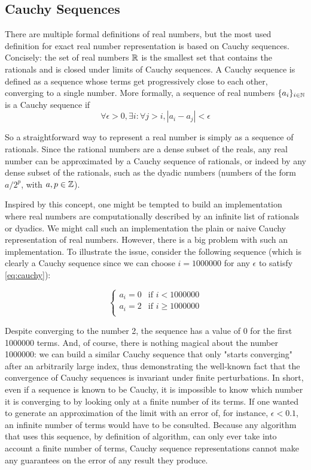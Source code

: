 \subsection{Cauchy Sequences}
\label{sec:cauchy}

There are multiple formal definitions of real numbers, but the most used definition for exact real number representation is based on Cauchy sequences. Concisely: the set of real numbers $\mathbb{R}$ is the smallest set that contains the rationals and is closed under limits of Cauchy sequences. A Cauchy sequence is defined as a sequence whose terms get progressively close to each other, converging to a single number. More formally, a sequence of real numbers $\{a_i\}_{i \in \mathbb{N}}$ is a Cauchy sequence if
\begin{equation}
\label{eq:cauchy}
\forall \epsilon>0, \exists i: \forall j>i, |a_i - a_j| < \epsilon
\end{equation}

So a straightforward way to represent a real number is simply as a sequence of rationals. Since the rational numbers are a dense subset of the reals, any real number can be approximated by a Cauchy sequence of rationals, or indeed by any dense subset of the rationals, such as the dyadic numbers (numbers of the form $a/2^p$, with $a,p \in \mathbb{Z}$).

Inspired by this concept, one might be tempted to build an implementation where real numbers are computationally described by an infinite list of rationals or dyadics. We might call such an implementation the plain or naive Cauchy representation of real numbers. However, there is a big problem with such an implementation. To illustrate the issue, consider the following sequence (which is clearly a Cauchy sequence since we can choose $i=1000000$ for any $\epsilon$ to satisfy \cref{eq:cauchy}):

\begin{equation}
\label{eq:insufficient_cauchy}
  \begin{cases} 
    a_i = 0 & \text{if } i < 1000000 \\
    a_i = 2 & \text{if } i \geq 1000000 \\
  \end{cases}
\end{equation}

Despite converging to the number 2, the sequence has a value of $0$ for the first 1000000 terms. And, of course, there is nothing magical about the number 1000000: we can build a similar Cauchy sequence that only "starts converging" after an arbitrarily large index, thus demonstrating the well-known fact that the convergence of Cauchy sequences is invariant under finite perturbations. In short, even if a sequence is known to be Cauchy, it is impossible to know which number it is converging to by looking only at a finite number of its terms. If one wanted to generate an approximation of the limit with an error of, for instance, $\epsilon < 0.1$, an infinite number of terms would have to be consulted. Because any algorithm that uses this sequence, by definition of algorithm, can only ever take into account a finite number of terms, Cauchy sequence representations cannot make any guarantees on the error of any result they produce.

